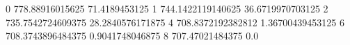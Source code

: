 0 778.88916015625 71.4189453125
1 744.1422119140625 36.6719970703125
2 735.7542724609375 28.2840576171875
4 708.8372192382812 1.36700439453125
6 708.3743896484375 0.9041748046875
8 707.47021484375 0.0
